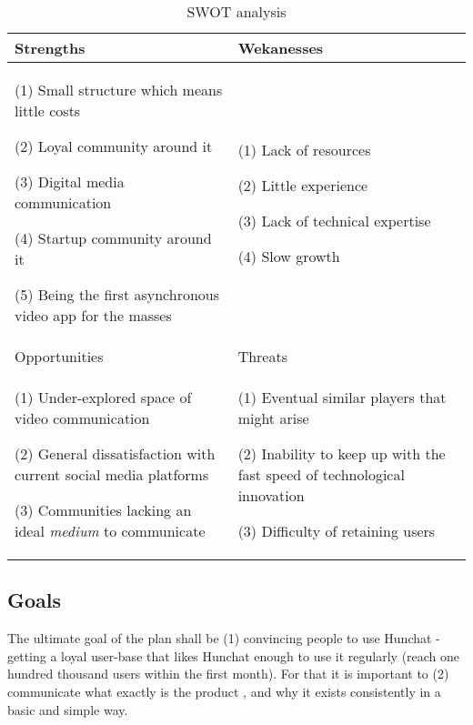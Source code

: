 \documentclass[12pt]{article}
\begin{document}
\begin{table}[htbp]
\small
\caption{SWOT analysis}
\label{table:swot}
\centering
\begin{tabular}{ @{}P{0.48\textwidth}P{0.48\textwidth}@{} }
\hline
Strengths                             &  Wekanesses                                                                                                                                                                                                                                                                                                                                                            
\\ \hline  
(1) Small structure which means little costs \par (2) Loyal community around it \par (3) Digital media communication \par (4) Startup community around it \par 	(5) Being the first asynchronous video app for the masses & (1) Lack of resources \par (2) Little experience \par (3) Lack of technical expertise \par (4) Slow growth       \\                                                                                                                                                                                                                    \hline
Opportunities		&	Threats
\\ \hline
 (1) Under-explored space of video communication \par (2) General dissatisfaction with current social media platforms \par (3) Communities lacking an ideal \textit{medium} to communicate 		&  (1) Eventual similar players that might arise \par (2) Inability to keep up with the fast speed of technological innovation \par (3) Difficulty of retaining users 
 \\ \hline
\end{tabular}
\end{table}


\subsection{Goals}
The ultimate goal of the plan shall be (1) convincing people to use Hunchat - getting a loyal user-base that likes Hunchat enough to use it regularly (reach one hundred thousand users within the first month).  For that it is important to (2) communicate what exactly is the product , and why it exists consistently in a basic and simple way.
\end{document}
